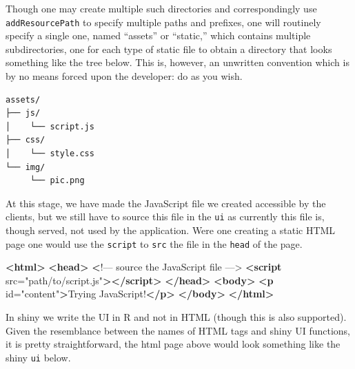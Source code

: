 \documentclass[10pt,]{krantz}
\makeatletter
\newenvironment{Shaded}{\begin{snugshade}}{\end{snugshade}}
\newcommand{\DataTypeTok}[1]{\textcolor[rgb]{0.27,0.27,0.27}{#1}}
\newcommand{\ErrorTok}[1]{\textcolor[rgb]{0.14,0.14,0.14}{\textbf{#1}}}
\newcommand{\KeywordTok}[1]{\textcolor[rgb]{0.27,0.27,0.27}{\textbf{#1}}}
\newcommand{\NormalTok}[1]{#1}
\newcommand{\OperatorTok}[1]{\textcolor[rgb]{0.43,0.43,0.43}{\textbf{#1}}}
\newcommand{\OtherTok}[1]{\textcolor[rgb]{0.37,0.37,0.37}{#1}}
\newcommand{\StringTok}[1]{\textcolor[rgb]{0.5,0.5,0.5}{#1}}
\newenvironment{kframe}{%
\medskip{}
\setlength{\fboxsep}{.8em}
 \def\at@end@of@kframe{}%
 \ifinner\ifhmode%
  \def\at@end@of@kframe{\end{minipage}}%
  \begin{minipage}{\columnwidth}%
 \fi\fi%
 \def\FrameCommand##1{\hskip\@totalleftmargin \hskip-\fboxsep
 \colorbox{shadecolor}{##1}\hskip-\fboxsep
     \hskip-\linewidth \hskip-\@totalleftmargin \hskip\columnwidth}%
 \MakeFramed {\advance\hsize-\width
   \@totalleftmargin\z@ \linewidth\hsize
   \@setminipage}}%
 {\par\unskip\endMakeFramed%
 \at@end@of@kframe}
\renewenvironment{Shaded}{\begin{kframe}}{\end{kframe}}
\makeatother
\begin{document}
Though one may create multiple such directories and correspondingly use \texttt{addResourcePath} to specify multiple paths and prefixes, one will routinely specify a single one, named ``assets'' or ``static,'' which contains multiple subdirectories, one for each type of static file to obtain a directory that looks something like the tree below. This is, however, an unwritten convention which is by no means forced upon the developer: do as you wish.

\begin{verbatim}
assets/
├── js/
│    └── script.js
├── css/
│    └── style.css
└── img/
     └── pic.png
\end{verbatim}

At this stage, we have made the JavaScript file we created accessible by the clients, but we still have to source this file in the \texttt{ui} as currently this file is, though served, not used by the application. Were one creating a static HTML page one would use the \texttt{script} to \texttt{src} the file in the \texttt{head} of the page.

\begin{Shaded}
\begin{Highlighting}[]
\KeywordTok{<html>}
  \KeywordTok{<head>}
    \ErrorTok{<}\NormalTok{!–– source the JavaScript file ––>}
    \KeywordTok{<script}\OtherTok{ src=}\StringTok{"path/to/script.js"}\KeywordTok{></script>}
  \KeywordTok{</head>}
  \KeywordTok{<body>}
    \KeywordTok{<p}\OtherTok{ id=}\StringTok{"content"}\KeywordTok{>}\NormalTok{Trying JavaScript!}\KeywordTok{</p>}
  \KeywordTok{</body>}
\KeywordTok{</html>}
\end{Highlighting}
\end{Shaded}

In shiny we write the UI in R and not in HTML (though this is also supported). Given the resemblance between the names of HTML tags and shiny UI functions, it is pretty straightforward, the html page above would look something like the shiny \texttt{ui} below.

\begin{Shaded}
\end{Shaded}
\end{document}
